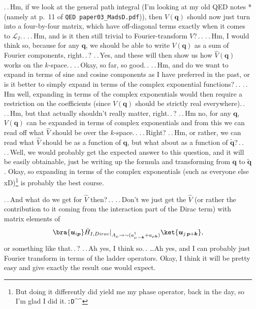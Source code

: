 \documentclass{report}
\begin{document}
.\,.\,Hm, if we look at the general path integral (I'm looking at my old QED notes *(namely at p.\ 11 of \texttt{QED paper03\_MadsD.pdf})), then $V(\boldsymbol{q})$ should now just turn into a four-by-four matrix, which have off-diagonal terms exactly when it comes to $\mathcal{L}_I$.\,. .\,.\,Hm, and is it then still trivial to Fourier-transform $V$?\,.\,. .\,.\,Hm, I would think so, because for any $\boldsymbol{q}$, we should be able to write $V(\boldsymbol{q})$ as a sum of Fourier components, right.\,.\,? .\,.\,Yes, and these will then show us how $\hat V(\boldsymbol{q})$ works on the $k$-space.\,. .\,.\,Okay, so far, so good.\,. .\,.\,Hm, and do we want to expand in terms of sine and cosine components as I have preferred in the past, or is it better to simply expand in terms of the complex exponential functions?\,.\,. .\,.\,Hm well, expanding in terms of the complex exponentials would then require a restriction on the coefficients (since $V(\boldsymbol{q})$ should be strictly real everywhere).\,. .\,.\,Hm, but that actually shouldn't really matter, right.\,.\,? .\,.\,Hm no, for any $\boldsymbol{q}$, $V(\boldsymbol{q})$ can be expanded in terms of complex exponentials and from this we can read off what $\hat V$ should be over the $k$-space.\,. .\,.\,Right? .\,.\,Hm, or rather, we can read what $\hat V$ should be as a function of $\boldsymbol{q}$, but what about as a function of $\tilde{\boldsymbol{q}}$?\,.\,. .\,.\,Well, we would probably get the expected answer to this question, and it will be easily obtainable, just be writing up the formula and transforming from $\boldsymbol{q}$ to $\tilde{\boldsymbol{q}}$. Okay, so expanding in terms of the complex exponentials (such as everyone else\,xD)\footnote{But doing it differently did yield me my phase operator, back in the day, so I'm glad I did it.\,\texttt{:D}\textasciicircum\textasciicircum} is probably the best course. 

.\,.\,And what do we get for $\hat V$ then?\,.\,. .\,.\,Don't we just get the $\hat V$ (or rather the contribution to it coming from the interaction part of the Dirac term) with matrix elements of 
\begin{align}
\begin{aligned}
	\bra{\boldsymbol{u}_{i \boldsymbol{p}}} 
		\hat H_{I, Dirac}|_{A_\mu \to \sim (a^\dagger_{\mu\, -\boldsymbol{k}} + a_{\mu \boldsymbol{k}})} 
	\ket{\boldsymbol{u}_{j\, \boldsymbol{p} + \boldsymbol{k}}},
\end{aligned}
\end{align}
or something like that.\,.\,? .\,.\,Ah yes, I think so.\,. \ldots Ah yes, and I can probably just Fourier transform in terms of the ladder operators. Okay, I think it will be pretty easy and give exactly the result one would expect. 
\end{document}
